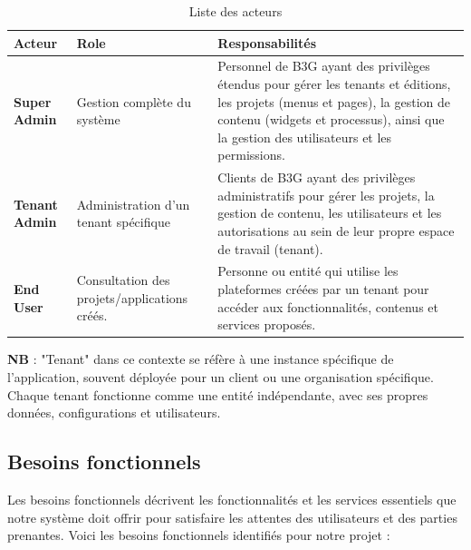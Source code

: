\begin{table}[h]
  \centering
  \captionsetup{justification=centering}
  \begin{tabular}{|p{}|p{}|p{}|}
    \hline
    \textbf{Acteur}       & \textbf{Role}                                & \textbf{Responsabilités}                                                                                                                                                                                                \\ \hline
    \textbf{Super Admin}  & Gestion complète du système                  & Personnel de B3G ayant des privilèges étendus pour gérer les tenants et éditions, les projets (menus et pages), la gestion de contenu (widgets et processus), ainsi que la gestion des utilisateurs et les permissions. \\ \hline
    \textbf{Tenant Admin} & Administration d'un tenant spécifique        & Clients de B3G ayant des privilèges administratifs pour gérer les projets, la gestion de contenu, les utilisateurs et les autorisations au sein de leur propre espace de travail (tenant).                              \\ \hline
    \textbf{End User}     & Consultation des projets/applications créés. & Personne ou entité qui utilise les plateformes créées par un tenant pour accéder aux fonctionnalités, contenus et services proposés.                                                                                    \\ \hline
  \end{tabular}
  \caption{Liste des acteurs}
  \label{tab:actors}
\end{table}

\textbf{NB} : "Tenant" dans ce contexte se réfère à une instance spécifique de l'application, souvent déployée pour un client ou une organisation spécifique. Chaque tenant fonctionne comme une entité indépendante, avec ses propres données, configurations et utilisateurs.

\subsection{Besoins fonctionnels}

\hspace{\parindent} Les besoins fonctionnels décrivent les fonctionnalités et les services essentiels que notre système doit offrir pour satisfaire les attentes des utilisateurs et des parties prenantes. Voici les besoins fonctionnels identifiés pour notre projet :

